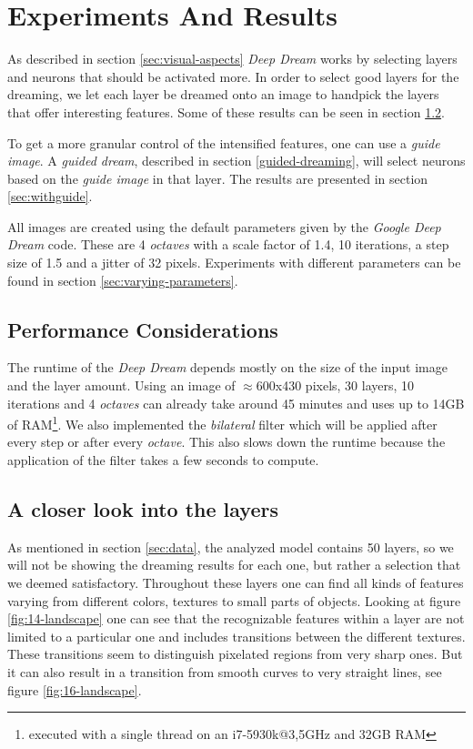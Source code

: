 \section{Experiments And Results}
\label{sec:evaluation}
As described in section \ref{sec:visual-aspects} \emph{Deep Dream} works by selecting layers and neurons that should be activated more.
In order to select good layers for the dreaming, we let each layer be dreamed onto an image to handpick the layers that offer interesting features.
Some of these results can be seen in section \ref{sec:withoutguide}.

To get a more granular control of the intensified features, one can use a \textit{guide image}.
A \textit{guided dream}, described in section \ref{guided-dreaming}, will select neurons based on the \textit{guide image} in that layer.
The results are presented in section \ref{sec:withguide}.

All images are created using the default parameters given by the \textit{Google Deep Dream} code.
These are 4 \textit{octaves} with a scale factor of 1.4, 10 iterations, a step size of 1.5 and a jitter of 32 pixels.
Experiments with different parameters can be found in section \ref{sec:varying-parameters}.


\subsection{Performance Considerations}
\label{sec:performance}
The runtime of the \textit{Deep Dream} depends mostly on the size of the input image and the layer amount.
Using an image of $\approx$600x430 pixels, 30 layers, 10 iterations and 4 \textit{octaves} can already take around 45 minutes and uses up to 14GB of RAM\footnote{executed with a single thread on an i7-5930k@3,5GHz and 32GB RAM}.
We also implemented the \textit{bilateral} filter which will be applied after every step or after every \textit{octave}.\cite{bilateral}
This also slows down the runtime because the application of the filter takes a few seconds to compute.

\newpage
\subsection{A closer look into the layers}
\label{sec:withoutguide}

As mentioned in section \ref{sec:data}, the analyzed model contains 50 layers, so we will not be showing the dreaming results for each one, but rather a selection that we deemed satisfactory.
Throughout these layers one can find all kinds of features varying from different colors, textures to small parts of objects.
Looking at figure \ref{fig:14-landscape} one can see that the recognizable features within a layer are not limited to a particular one and includes transitions between the different textures.
These transitions seem to distinguish pixelated regions from very sharp ones.
But it can also result in a transition from smooth curves to very straight lines, see figure \ref{fig:16-landscape}.

